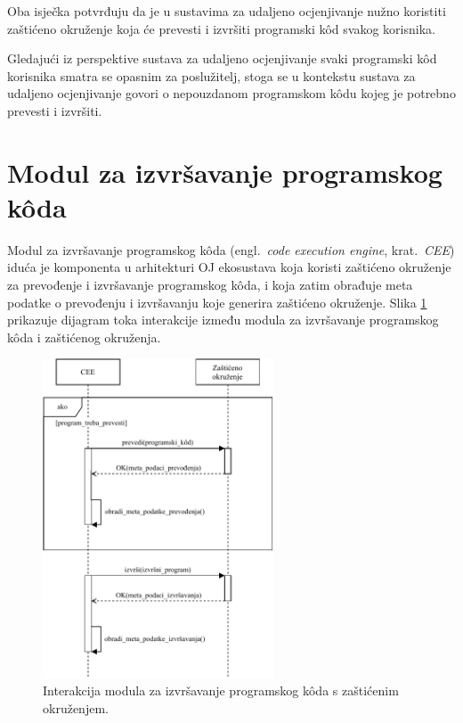 \documentclass[times, utf8, diplomski]{fer}
\begin{document}
Oba isječka potvrđuju da je u sustavima za udaljeno ocjenjivanje nužno koristiti zaštićeno okruženje koja će prevesti i izvršiti programski kôd svakog korisnika. 

Gledajući iz perspektive sustava za udaljeno ocjenjivanje svaki programski kôd korisnika smatra se opasnim za poslužitelj, stoga se u kontekstu sustava za udaljeno ocjenjivanje govori o nepouzdanom programskom kôdu  kojeg je potrebno prevesti i izvršiti.

\section{Modul za izvršavanje programskog kôda}
Modul za izvršavanje programskog kôda (engl.\ \textit{code execution engine}, krat.\ \textit{CEE}) iduća je komponenta u arhitekturi OJ ekosustava koja koristi zaštićeno okruženje za prevođenje i izvršavanje programskog kôda, i koja zatim obrađuje meta podatke o prevođenju i izvršavanju koje generira zaštićeno okruženje. Slika \ref{fig:cee-and-sandbox} prikazuje dijagram toka interakcije između modula za izvršavanje programskog kôda i zaštićenog okruženja.

\begin{figure}[htb]
	\centering
	\includegraphics[width=0.61\textwidth]{images/CEE i zasticeno okruzenje.pdf}
	\caption{
		Interakcija modula za izvršavanje programskog kôda s zaštićenim okruženjem.
	}
	\label{fig:cee-and-sandbox}
\end{figure}
\end{document}
